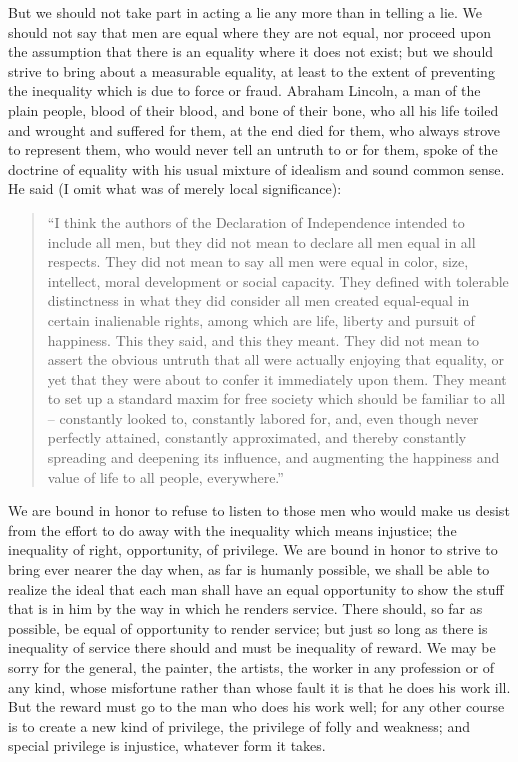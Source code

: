 \documentclass[a4paper]{amsbook}
\begin{document}
But we should not take part in acting a lie any more than in telling a lie. We should not say that men are equal where they are not equal, nor proceed upon the assumption that there is an equality where it does not exist; but we should strive to bring about a measurable equality, at least to the extent of preventing the inequality which is due to force or fraud. Abraham Lincoln, a man of the plain people, blood of their blood, and bone of their bone, who all his life toiled and wrought and suffered for them, at the end died for them, who always strove to represent them, who would never tell an untruth to or for them, spoke of the doctrine of equality with his usual mixture of idealism and sound common sense. He said (I omit what was of merely local significance):

\begin{quote}“I think the authors of the Declaration of Independence intended to include all men, but they did not mean to declare all men equal in all respects. They did not mean to say all men were equal in color, size, intellect, moral development or social capacity. They defined with tolerable distinctness in what they did consider all men created equal-equal in certain inalienable rights, among which are life, liberty and pursuit of happiness. This they said, and this they meant. They did not mean to assert the obvious untruth that all were actually enjoying that equality, or yet that they were about to confer it immediately upon them. They meant to set up a standard maxim for free society which should be familiar to all – constantly looked to, constantly labored for, and, even though never perfectly attained, constantly approximated, and thereby constantly spreading and deepening its influence, and augmenting the happiness and value of life to all people, everywhere.”\end{quote}

We are bound in honor to refuse to listen to those men who would make us desist from the effort to do away with the inequality which means injustice; the inequality of right, opportunity, of privilege. We are bound in honor to strive to bring ever nearer the day when, as far is humanly possible, we shall be able to realize the ideal that each man shall have an equal opportunity to show the stuff that is in him by the way in which he renders service. There should, so far as possible, be equal of opportunity to render service; but just so long as there is inequality of service there should and must be inequality of reward. We may be sorry for the general, the painter, the artists, the worker in any profession or of any kind, whose misfortune rather than whose fault it is that he does his work ill. But the reward must go to the man who does his work well; for any other course is to create a new kind of privilege, the privilege of folly and weakness; and special privilege is injustice, whatever form it takes.
\end{document}

